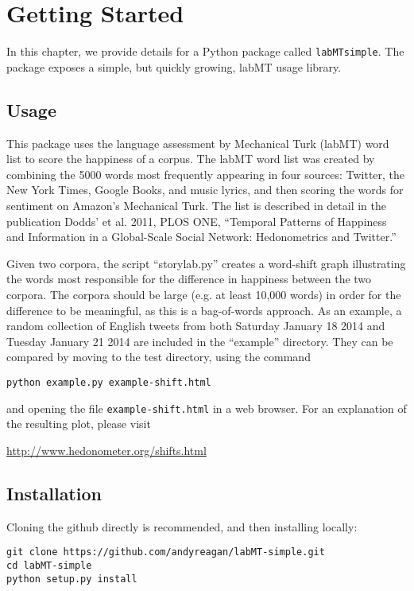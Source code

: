 \section{Getting Started}
\label{getting-started:welcome-to-labmt-simple-s-documentation}\label{getting-started:getting-started}\label{getting-started::doc}

In this chapter, we provide details for a Python package called \verb|labMTsimple|.
The package exposes a simple, but quickly growing, labMT usage library.

\subsection{Usage}
\label{getting-started:usage}
This package uses the language assessment by Mechanical Turk (labMT) word list to score the happiness of a corpus. The labMT word list was created by combining the 5000 words most frequently appearing in four sources: Twitter, the New York Times, Google Books, and music lyrics, and then scoring the words for sentiment on Amazon's Mechanical Turk. The list is described in detail in the publication Dodds' et al. 2011, PLOS ONE, ``Temporal Patterns of Happiness and Information in a Global-Scale Social Network: Hedonometrics and Twitter.''

Given two corpora, the script ``storylab.py'' creates a word-shift graph illustrating the words most responsible for the difference in happiness between the two corpora. The corpora should be large (e.g. at least 10,000 words) in order for the difference to be meaningful, as this is a bag-of-words approach. As an example, a random collection of English tweets from both Saturday January 18 2014 and Tuesday January 21 2014 are included in the ``example'' directory. They can be compared by moving to the test directory, using the command
\begin{lstlisting}
python example.py example-shift.html
\end{lstlisting}

and opening the file \lstinline{example-shift.html} in a web browser. For an explanation of the resulting plot, please visit

\href{http://www.hedonometer.org/shifts.html}{http://www.hedonometer.org/shifts.html}


\subsection{Installation}
\label{getting-started:installation}
Cloning the github directly is recommended, and then installing locally:
\begin{lstlisting}
git clone https://github.com/andyreagan/labMT-simple.git
cd labMT-simple
python setup.py install
\end{lstlisting}

